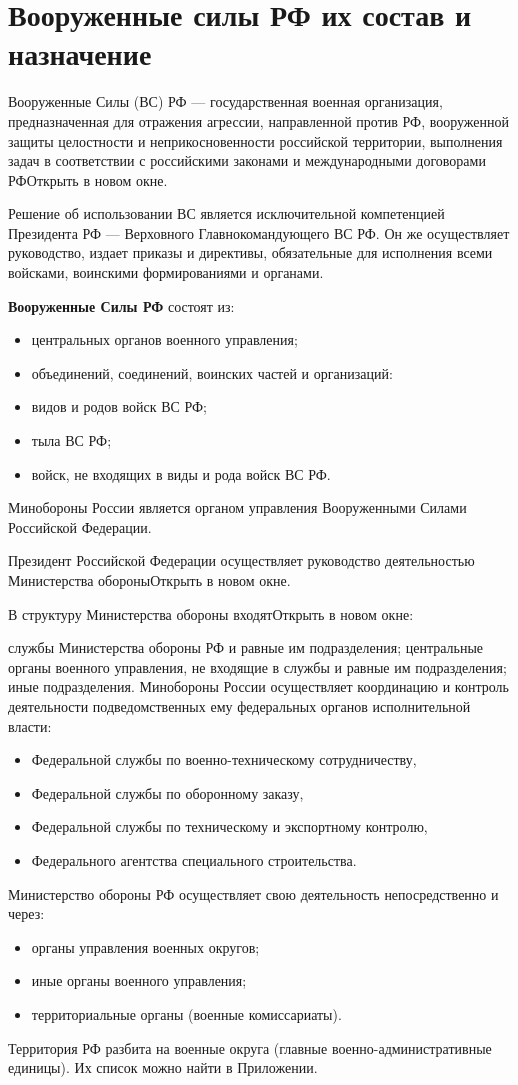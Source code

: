 \documentclass[12pt,a4paper]{report}
\begin{document}
\section{Вооруженные силы РФ их состав и назначение}
Вооруженные Силы (ВС) РФ — государственная военная организация, предназначенная для отражения агрессии, направленной против РФ, вооруженной защиты целостности и неприкосновенности российской территории, выполнения задач в соответствии с российскими законами и международными договорами РФОткрыть в новом окне.

Решение об использовании ВС является исключительной компетенцией Президента РФ — Верховного Главнокомандующего ВС РФ. Он же осуществляет руководство, издает приказы и директивы, обязательные для исполнения всеми войсками, воинскими формированиями и органами.

\textbf{Вооруженные Силы РФ} состоят из:
\begin{itemize}
\item центральных органов военного управления;
\item объединений, соединений, воинских частей и организаций:
\item видов и родов войск ВС РФ;
\item тыла ВС РФ;
\item войск, не входящих в виды и рода войск ВС РФ.
\end{itemize}


Минобороны России является органом управления Вооруженными Силами Российской Федерации.

Президент Российской Федерации осуществляет руководство деятельностью Министерства обороныОткрыть в новом окне.

В структуру Министерства обороны входятОткрыть в новом окне:

службы Министерства обороны РФ и равные им подразделения;
центральные органы военного управления, не входящие в службы и равные им подразделения;
иные подразделения.
Минобороны России осуществляет координацию и контроль деятельности подведомственных ему федеральных органов исполнительной власти:
\begin{itemize}
\item Федеральной службы по военно-техническому сотрудничеству,
\item Федеральной службы по оборонному заказу,
\item Федеральной службы по техническому и экспортному контролю,
\item Федерального агентства специального строительства.
\end{itemize}
Министерство обороны РФ осуществляет свою деятельность непосредственно и через:
\begin{itemize}

\item органы управления военных округов;
\item иные органы военного управления;
\item территориальные органы (военные комиссариаты).
\end{itemize}
Территория РФ разбита на военные округа (главные военно-административные единицы).
 Их список можно найти в Приложении.
\end{document}
